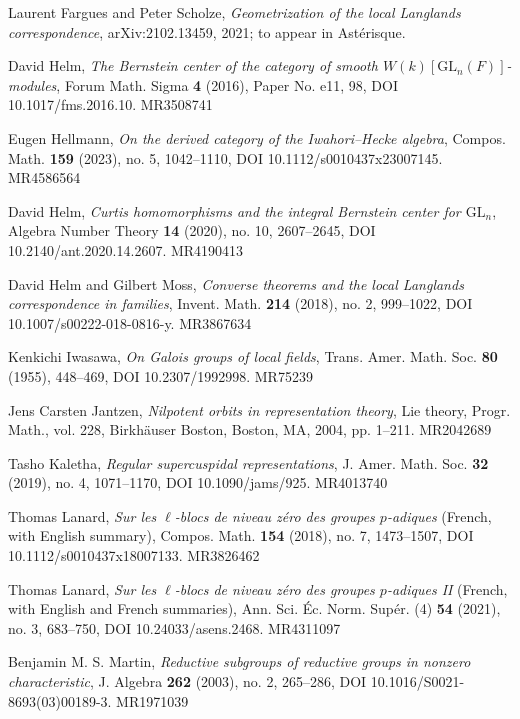 \begin{refs}
\item[{[FS21]}] Laurent Fargues and Peter Scholze, \emph{Geometrization of the local Langlands correspondence}, arXiv:2102.13459, 2021; to appear in Ast\'erisque.
\item[{[Hel16]}] David Helm, \emph{The Bernstein center of the category of smooth $W(k)[\mathrm{GL}_n(F)]$-modules}, Forum Math. Sigma \textbf{4} (2016), Paper No. e11, 98, DOI 10.1017/fms.2016.10. MR3508741
\item[{[Hel23]}] Eugen Hellmann, \emph{On the derived category of the Iwahori--Hecke algebra}, Compos. Math. \textbf{159} (2023), no. 5, 1042--1110, DOI 10.1112/s0010437x23007145. MR4586564
\item[{[Hel20b]}] David Helm, \emph{Curtis homomorphisms and the integral Bernstein center for $\mathrm{GL}_n$}, Algebra Number Theory \textbf{14} (2020), no. 10, 2607--2645, DOI 10.2140/ant.2020.14.2607. MR4190413
\item[{[HM18]}] David Helm and Gilbert Moss, \emph{Converse theorems and the local Langlands correspondence in families}, Invent. Math. \textbf{214} (2018), no. 2, 999--1022, DOI 10.1007/s00222-018-0816-y. MR3867634
\item[{[Iwa55]}] Kenkichi Iwasawa, \emph{On Galois groups of local fields}, Trans. Amer. Math. Soc. \textbf{80} (1955), 448--469, DOI 10.2307/1992998. MR75239
\item[{[Jan04]}] Jens Carsten Jantzen, \emph{Nilpotent orbits in representation theory}, Lie theory, Progr. Math., vol. 228, Birkh\"auser Boston, Boston, MA, 2004, pp. 1--211. MR2042689
\item[{[Kal19]}] Tasho Kaletha, \emph{Regular supercuspidal representations}, J. Amer. Math. Soc. \textbf{32} (2019), no. 4, 1071--1170, DOI 10.1090/jams/925. MR4013740
\item[{[Lan18]}] Thomas Lanard, \emph{Sur les $\ell$-blocs de niveau z\'ero des groupes $p$-adiques} (French, with English summary), Compos. Math. \textbf{154} (2018), no. 7, 1473--1507, DOI 10.1112/s0010437x18007133. MR3826462
\item[{[Lan21]}] Thomas Lanard, \emph{Sur les $\ell$-blocs de niveau z\'ero des groupes $p$-adiques II} (French, with English and French summaries), Ann. Sci. \'Ec. Norm. Sup\'er. (4) \textbf{54} (2021), no. 3, 683--750, DOI 10.24033/asens.2468. MR4311097
\item[{[Mar03]}] Benjamin M. S. Martin, \emph{Reductive subgroups of reductive groups in nonzero characteristic}, J. Algebra \textbf{262} (2003), no. 2, 265--286, DOI 10.1016/S0021-8693(03)00189-3. MR1971039

\end{refs}

